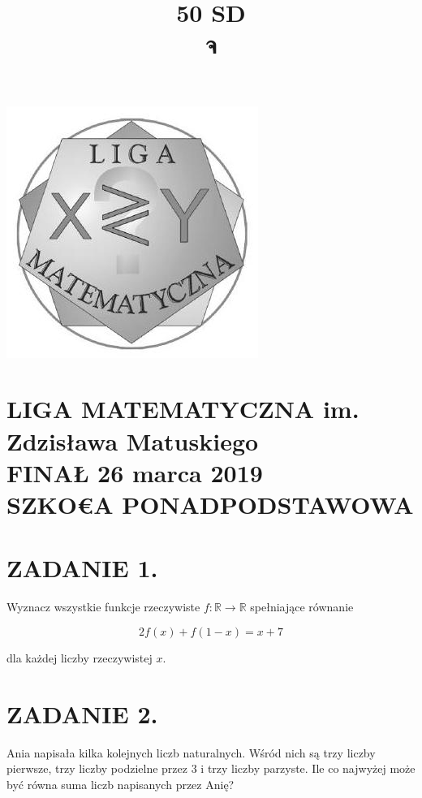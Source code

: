 \documentclass[10pt]{article}
\title{50 SD \\
 จ }
\author{}
\date{}
\begin{document}
\maketitle
\begin{center}
\includegraphics[max width=\textwidth]{2024_11_21_a089302363a768460258g-1}
\end{center}

\section*{LIGA MATEMATYCZNA im. Zdzisława Matuskiego \\
 FINAŁ 26 marca 2019 \\
 SZKO€A PONADPODSTAWOWA}
\section*{ZADANIE 1.}
Wyznacz wszystkie funkcje rzeczywiste \(f: \mathbb{R} \rightarrow \mathbb{R}\) spełniające równanie

\[
2 f(x)+f(1-x)=x+7
\]

dla każdej liczby rzeczywistej \(x\).

\section*{ZADANIE 2.}
Ania napisała kilka kolejnych liczb naturalnych. Wśród nich są trzy liczby pierwsze, trzy liczby podzielne przez 3 i trzy liczby parzyste. Ile co najwyżej może być równa suma liczb napisanych przez Anię?
\end{document}
